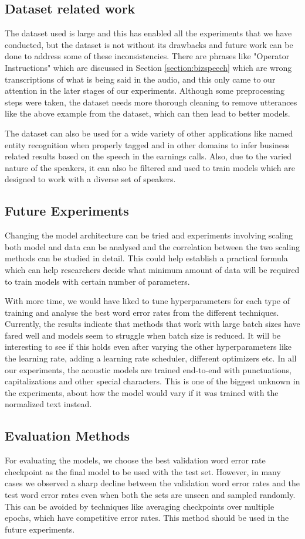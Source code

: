 \subsection{Dataset related work}
The dataset used is large and this has enabled all the experiments that we have conducted, but the dataset is not without its drawbacks and future work can be done to address some of these inconsistencies. There are phrases like "Operator Instructions" which are discussed in Section \ref{section:bizspeech} which are wrong transcriptions of what is being said in the audio, and this only came to our attention in the later stages of our experiments. Although some preprocessing steps were taken, the dataset needs more thorough cleaning to remove utterances like the above example from the dataset, which can then lead to better models.

The dataset can also be used for a wide variety of other applications like named entity recognition when properly tagged and in other domains to infer business related results based on the speech in the earnings calls. Also, due to the varied nature of the speakers, it can also be filtered and used to train models which are designed to work with a diverse set of speakers.  

\subsection{Future Experiments}
Changing the model architecture can be tried and experiments involving scaling both model and data can be analysed and the correlation between the two scaling methods can be studied in detail. This could help establish a practical formula which can help researchers decide what minimum amount of data will be required to train models with certain number of parameters. 

With more time, we would have liked to tune hyperparameters for each type of training and analyse the best word error rates from the different techniques. Currently, the results indicate that methods that work with large batch sizes have fared well and models seem to struggle when batch size is reduced. It will be interesting to see if this holds even after varying the other hyperparameters like the learning rate, adding a learning rate scheduler, different optimizers etc. In all our experiments, the acoustic models are trained end-to-end with punctuations, capitalizations and other special characters. This is one of the biggest unknown in the experiments, about how the model would vary if it was trained with the normalized text instead. 

\subsection{Evaluation Methods}
For evaluating the models, we choose the best validation word error rate checkpoint as the final model to be used with the test set. However, in many cases we observed a sharp decline between the validation word error rates and the test word error rates even when both the sets are unseen and sampled randomly. This can be avoided by techniques like averaging checkpoints over multiple epochs, which have competitive error rates. This method should be used in the future experiments.